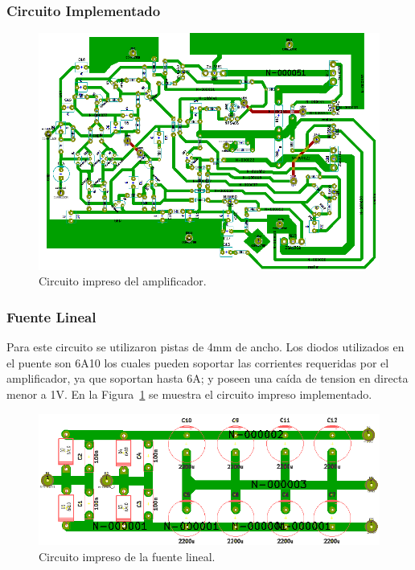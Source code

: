 \subsubsection{Circuito Implementado}
\begin{figure}[H]
\centerline{
\includegraphics[scale=0.55]{img/circuito_implementado_todo.png}}
\caption{Circuito impreso del amplificador.}
\end{figure}

\subsubsection{Fuente Lineal}
\medskip
Para este circuito se utilizaron pistas de 4mm de ancho. Los diodos utilizados en el puente son 6A10 los cuales pueden soportar las corrientes requeridas por el amplificador, ya que soportan hasta 6A; y poseen una caída de tension en directa menor a 1V.
En la Figura~\ref{circuito_impreso_fuente_lineal} se muestra el circuito impreso implementado. 

\begin{figure}[H]
\centering
\centerline{\includegraphics[scale=0.53]{img/circuito_impreso_fuente_lineal.png}}
\caption{Circuito impreso de la fuente lineal.}
\label{circuito_impreso_fuente_lineal} 
\end{figure}
